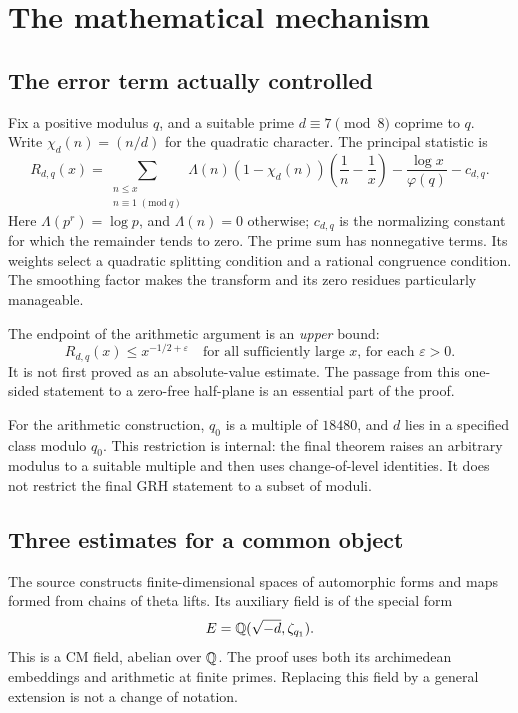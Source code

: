 \section{The mathematical mechanism}\label{sec:mechanism}

\subsection{The error term actually controlled}

Fix a positive modulus \(q\), and a suitable prime \(d\equiv7\pmod8\) coprime to \(q\). Write
\(\chi_d(n)=(n/d)\) for the quadratic character. The principal statistic is
\begin{equation}\label{eq:R}
R_{d,q}(x)=
\sum_{\substack{n\le x\\n\equiv1\;(\mathrm{mod}\ q)}}
\Lambda(n)(1-\chi_d(n))
\left(\frac1n-\frac1x\right)
-\frac{\log x}{\varphi(q)}-c_{d,q}.
\end{equation}
Here \(\Lambda(p^r)=\log p\), and \(\Lambda(n)=0\) otherwise; \(c_{d,q}\) is the normalizing constant for which the remainder tends to zero. The prime sum has nonnegative terms. Its weights select a quadratic splitting condition and a rational congruence condition. The smoothing factor makes the transform and its zero residues particularly manageable.

The endpoint of the arithmetic argument is an \emph{upper} bound:
\begin{equation}\label{eq:one-sided}
R_{d,q}(x)\le x^{-1/2+\varepsilon}
\quad\text{for all sufficiently large \(x\), for each \(\varepsilon>0\).}
\end{equation}
It is not first proved as an absolute-value estimate. The passage from this one-sided statement to a zero-free half-plane is an essential part of the proof.

For the arithmetic construction, \(q_0\) is a multiple of \(18480\), and \(d\) lies in a specified class modulo \(q_0\). This restriction is internal: the final theorem raises an arbitrary modulus to a suitable multiple and then uses change-of-level identities. It does not restrict the final GRH statement to a subset of moduli.

\subsection{Three estimates for a common object}

The source constructs finite-dimensional spaces of automorphic forms and maps formed from chains of theta lifts. Its auxiliary field is of the special form
\[
E=\mathbb{Q}(\sqrt{-d},\zeta_{q_1}).
\]
This is a CM field, abelian over \(\mathbb{Q}\). The proof uses both its archimedean embeddings and arithmetic at finite primes. Replacing this field by a general extension is not a change of notation.

